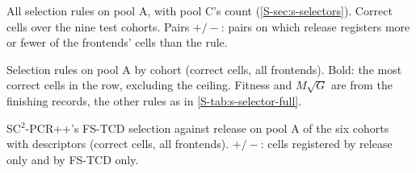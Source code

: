 \begin{table}[t]
\caption{All selection rules on pool A, with pool C's count (\cref{S-sec:s-selectors}). Correct cells over the nine test cohorts. Pairs $+/{-}$: pairs on which release registers more or fewer of the frontends' cells than the rule.}
\label{S-tab:s-selector-full}
\centering

\end{table}

\begin{table}[t]
\caption{Selection rules on pool A by cohort (correct cells, all frontends). Bold: the most correct cells in the row, excluding the ceiling. Fitness and $M\sqrt G$ are from the finishing records, the other rules as in \cref{S-tab:s-selector-full}.}
\label{S-tab:s-selector-cohort}
\centering

\end{table}

\begin{table}[t]
\caption{SC$^2$-PCR++'s FS-TCD selection against release on pool A of the six cohorts with descriptors (correct cells, all frontends). $+/{-}$: cells registered by release only and by FS-TCD only.}
\label{S-tab:s-fstcd}
\centering

\end{table}

